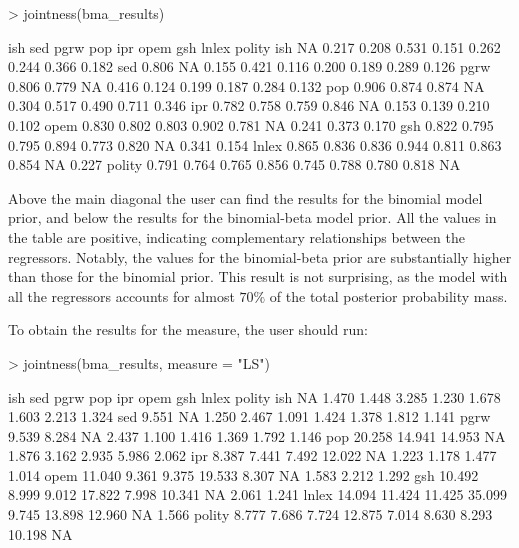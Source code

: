\documentclass[a4paper]{article}
\begin{document}
\begin{Schunk}
\begin{Sinput}
> jointness(bma_results)
\end{Sinput}
\begin{Soutput}
         ish   sed  pgrw   pop   ipr  opem   gsh lnlex polity
ish       NA 0.217 0.208 0.531 0.151 0.262 0.244 0.366  0.182
sed    0.806    NA 0.155 0.421 0.116 0.200 0.189 0.289  0.126
pgrw   0.806 0.779    NA 0.416 0.124 0.199 0.187 0.284  0.132
pop    0.906 0.874 0.874    NA 0.304 0.517 0.490 0.711  0.346
ipr    0.782 0.758 0.759 0.846    NA 0.153 0.139 0.210  0.102
opem   0.830 0.802 0.803 0.902 0.781    NA 0.241 0.373  0.170
gsh    0.822 0.795 0.795 0.894 0.773 0.820    NA 0.341  0.154
lnlex  0.865 0.836 0.836 0.944 0.811 0.863 0.854    NA  0.227
polity 0.791 0.764 0.765 0.856 0.745 0.788 0.780 0.818     NA
\end{Soutput}
\end{Schunk}

\noindent Above the main diagonal the user can find the results for the binomial model prior, and below the results for the binomial-beta model prior.
All the values in the table are positive, indicating complementary relationships between the regressors.
Notably, the values for the binomial-beta prior are substantially higher than those for the binomial prior.
This result is not surprising, as the model with all the regressors accounts for almost $70\%$ of the total posterior probability mass.

To obtain the results for the \citet{Ley+2007} measure, the user should run:

\begin{Schunk}
\begin{Sinput}
> jointness(bma_results, measure = "LS")
\end{Sinput}
\begin{Soutput}
          ish    sed   pgrw    pop   ipr   opem    gsh  lnlex polity
ish        NA  1.470  1.448  3.285 1.230  1.678  1.603  2.213  1.324
sed     9.551     NA  1.250  2.467 1.091  1.424  1.378  1.812  1.141
pgrw    9.539  8.284     NA  2.437 1.100  1.416  1.369  1.792  1.146
pop    20.258 14.941 14.953     NA 1.876  3.162  2.935  5.986  2.062
ipr     8.387  7.441  7.492 12.022    NA  1.223  1.178  1.477  1.014
opem   11.040  9.361  9.375 19.533 8.307     NA  1.583  2.212  1.292
gsh    10.492  8.999  9.012 17.822 7.998 10.341     NA  2.061  1.241
lnlex  14.094 11.424 11.425 35.099 9.745 13.898 12.960     NA  1.566
polity  8.777  7.686  7.724 12.875 7.014  8.630  8.293 10.198     NA
\end{Soutput}
\end{Schunk}
\end{document}
